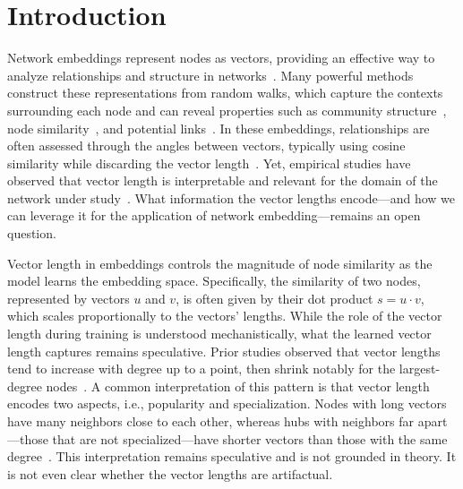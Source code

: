 \documentclass[aps,pre,reprint,superscriptaddress,longbibliography]{revtex4-2}
\begin{document}
\section{Introduction}

Network embeddings represent nodes as vectors, providing an effective way to analyze relationships and structure in networks~\citep{hamilton2017representation,dehghan2022evaluating,perozzi2014deepwalk,grover2016node2vec,qiu2018network,kojaku2021residual2vec,kojaku2024network}. 
Many powerful methods construct these representations from random walks, which capture the contexts surrounding each node and can reveal properties such as community structure~\citep{kojaku2024network,zhang2022exact,davison2024community,harker2024convergence}, node similarity~\citep{perozzi2014deepwalk,grover2016node2vec}, and potential links~\citep{grover2016node2vec,kojaku2021residual2vec}. 
In these embeddings, relationships are often assessed through the angles between vectors, typically using cosine similarity while discarding the vector length~\citep{kojaku2024network,tandon2021community,kim2026uncovering,kovacs2024iterative,zhiyuli2016learning,zhang2021adaptive}. 
Yet, empirical studies have observed that vector length is interpretable and relevant for the domain of the network under study~\citep{murray2023unsupervised,schakel2015measuring,oyama2022norm,draganov2025importance}.
What information the vector lengths encode---and how we can leverage it for the application of network embedding---remains an open question.

Vector length in embeddings controls the magnitude of node similarity as the model learns the embedding space. 
Specifically, the similarity of two nodes, represented by vectors $u$ and $v$, is often given by their dot product $s=u \cdot v$, which scales proportionally to the vectors' lengths. 
While the role of the vector length during training is understood mechanistically, what the learned vector length captures remains speculative. 
Prior studies observed that vector lengths tend to increase with degree up to a point, then shrink notably for the largest-degree nodes~\citep{murray2023unsupervised,schakel2015measuring}.
A common interpretation of this pattern is that vector length encodes two aspects, i.e., popularity and specialization. 
Nodes with long vectors have many neighbors close to each other, whereas hubs with neighbors far apart---those that are not specialized---have shorter vectors than those with the same degree~\citep{murray2023unsupervised}.
This interpretation remains speculative and is not grounded in theory. It is not even clear whether the vector lengths are artifactual. 
\end{document}
